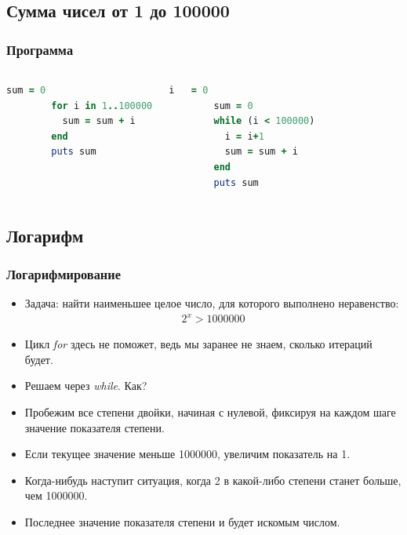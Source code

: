 \documentclass[compress,red]{beamer}
\begin{document}
\subsection{Сумма чисел от 1 до 100000}
\begin{frame}[fragile]
  \frametitle{Программа}
  	\begin{columns}[t]
    \column{2.0in}
      \begin{lstlisting}[language=ruby,numbersep=2pt,basicstyle=\footnotesize,label=ruby6,caption=for]
        sum = 0
        for i in 1..100000
          sum = sum + i
        end
        puts sum
      \end{lstlisting}
    \column{2.0in}
      \begin{lstlisting}[language=ruby,basicstyle=\footnotesize,label=ruby7,caption=while]
        i   = 0
        sum = 0
        while (i < 100000)
          i = i+1
          sum = sum + i
        end
        puts sum
      \end{lstlisting}
    \end{columns}
\end{frame}

\subsection{Логарифм}
\begin{frame}[fragile]
  \frametitle{Логарифмирование}
		\begin{itemize}
  		\item Задача: найти наименьшее целое число, для которого выполнено неравенство:
  		  \begin{gather*}
  		    2^x > 1000000
		    \end{gather*}
		  \item Цикл \emph{for} здесь не поможет, ведь мы заранее не знаем, сколько итераций будет.
		  \item Решаем через \emph{while}. Как?
		  \item Пробежим все степени двойки, начиная с нулевой, фиксируя на каждом шаге значение показателя степени.
		  \item Если текущее значение меньше 1000000, увеличим показатель на 1.
		  \item Когда-нибудь наступит ситуация, когда 2 в какой-либо степени станет больше, чем 1000000. 
		  \item Последнее значение показателя степени и будет искомым числом.
  	\end{itemize}
\end{frame}
\end{document}
